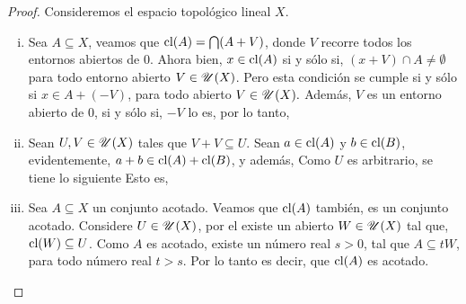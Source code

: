 \begin{proof} Consideremos el espacio topológico lineal
$X$.
\begin{enumerate}[i.]
	\item Sea $A\subseteq X$, veamos que $\mathop{\hbox{\rm cl}}\nolimits(A)=\bigcap(A+V)$, 
	donde $V$ recorre todos los entornos abiertos de $0$.
	Ahora bien, $x\in \mathop{\hbox{\rm cl}}\nolimits(A)$ si y sólo si, 
	$(x+V)\cap A \neq\emptyset$ para todo entorno abierto 
	$V\in\mathscr{U}(X)$. 
	Pero esta condición se cumple si y sólo si 
	$x\in A+(-V)$, para todo
	abierto $V\in\mathscr{U}(X).$ Además, $V$ es un 
	entorno abierto de $0$, si y sólo si, $-V$ lo es, 
	por lo tanto, 
	\item Sean $U,V\in\mathscr{U}(X)$ tales que $V+V\subseteq U$. 
	Sean $a\in\mathop{\hbox{\rm cl}}\nolimits(A)$ y $b\in\mathop{\hbox{\rm cl}}\nolimits(B)$, evidentemente,
	$a+b\in\mathop{\hbox{\rm cl}}\nolimits(A)+\mathop{\hbox{\rm cl}}\nolimits(B)$, y además,
	Como $U$ es arbitrario, se tiene lo siguiente
	Esto es,
	\item Sea $A\subseteq X$ un conjunto acotado. Veamos que
	$\mathop{\hbox{\rm cl}}\nolimits(A)$ también, es un conjunto acotado. 
	Considere $U\in \mathscr{U}(X)$, por el  existe un 
	abierto $W\in\mathscr{U}(X)$ tal que, $\mathop{\hbox{\rm cl}}\nolimits(W)\subseteq U$. Como
	$A$ es acotado, existe 
	un número real $s>0$, tal que $A\subseteq tW$,
	para todo número real $t>s$. Por lo tanto
	es decir, que $\mathop{\hbox{\rm cl}}\nolimits(A)$ es acotado.
\end{enumerate}
\end{proof}


